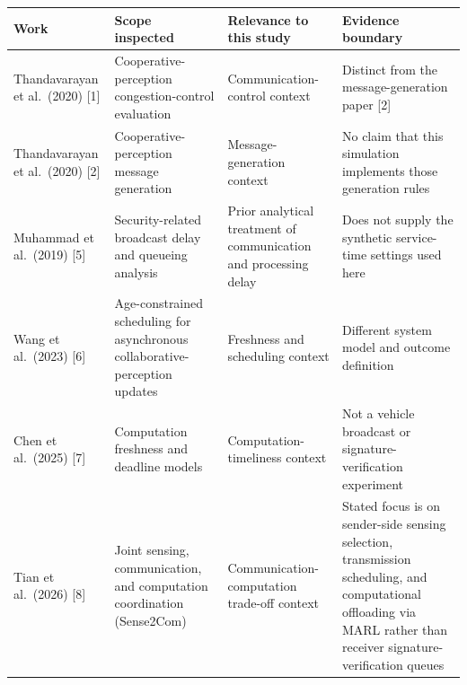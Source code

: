 \documentclass[
]{article}
\newcounter{none} %
\begin{document}
{\def\LTcaptype{none} %
\begin{longtable}[]{@{}
  >{\raggedright\arraybackslash}p{}
  >{\raggedright\arraybackslash}p{}
  >{\raggedright\arraybackslash}p{}
  >{\raggedright\arraybackslash}p{}@{}}
\toprule\noalign{}
\begin{minipage}[b]{\linewidth}\raggedright
Work
\end{minipage} & \begin{minipage}[b]{\linewidth}\raggedright
Scope inspected
\end{minipage} & \begin{minipage}[b]{\linewidth}\raggedright
Relevance to this study
\end{minipage} & \begin{minipage}[b]{\linewidth}\raggedright
Evidence boundary
\end{minipage} \\
\midrule\noalign{}
\endhead
\bottomrule\noalign{}
\endlastfoot
Thandavarayan et al.~(2020) {[}1{]} & Cooperative-perception
congestion-control evaluation & Communication-control context & Distinct
from the message-generation paper {[}2{]} \\
Thandavarayan et al.~(2020) {[}2{]} & Cooperative-perception message
generation & Message-generation context & No claim that this simulation
implements those generation rules \\
Muhammad et al.~(2019) {[}5{]} & Security-related broadcast delay and
queueing analysis & Prior analytical treatment of communication and
processing delay & Does not supply the synthetic service-time settings
used here \\
Wang et al.~(2023) {[}6{]} & Age-constrained scheduling for asynchronous
collaborative-perception updates & Freshness and scheduling context &
Different system model and outcome definition \\
Chen et al.~(2025) {[}7{]} & Computation freshness and deadline models &
Computation-timeliness context & Not a vehicle broadcast or
signature-verification experiment \\
Tian et al.~(2026) {[}8{]} & Joint sensing, communication, and
computation coordination (Sense2Com) & Communication-computation
trade-off context & Stated focus is on sender-side sensing selection,
transmission scheduling, and computational offloading via MARL rather
than receiver signature-verification queues \\
\end{longtable}
}
\end{document}
